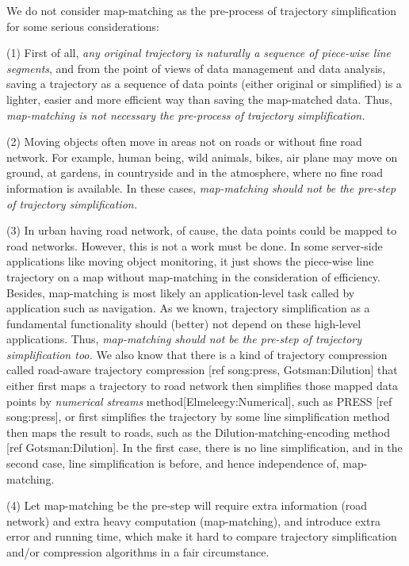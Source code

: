 \documentclass{letter}
\begin{document}
We do not consider map-matching as the pre-process of trajectory simplification for some serious considerations:

(1) First of all, \emph{any original trajectory is naturally a sequence of piece-wise line segments}, and from the point of views of data management and data analysis, saving a trajectory as a sequence of data points (either original or simplified) is a lighter, easier and more efficient way than saving the map-matched data. Thus, \emph{map-matching is not necessary the pre-process of trajectory simplification.} 


(2) Moving objects often move in areas not on roads or without fine road network. For example, human being, wild animals, bikes, air plane may move on ground, at gardens, in countryside and in the atmosphere, where no fine road information is available. In these cases, \emph{map-matching should not be the pre-step of trajectory simplification.}

(3) In urban having road network, of cause, the data points could be mapped to road networks. However, this is not a work must be done. In some server-side applications like moving object monitoring, it just shows the piece-wise line trajectory on a map without map-matching in the consideration of efficiency. Besides, map-matching is most likely an application-level task called by application such as navigation. As we known, trajectory simplification as a fundamental functionality should (better) not depend on these high-level applications. Thus, \emph{map-matching should not be the pre-step of trajectory simplification too.}
%
We also know that there is a kind of trajectory compression called road-aware trajectory compression [ref song:press, Gotsman:Dilution] that either first maps a trajectory to road network then simplifies those mapped data points by \emph{numerical streams} method[Elmeleegy:Numerical], such as PRESS [ref song:press], or first simplifies the trajectory by some line simplification method then maps the result to roads, such as the Dilution-matching-encoding method [ref Gotsman:Dilution]. In the first case, there is no line simplification, and in the second case, line simplification is before, and hence independence of, map-matching. 

(4) Let map-matching be the pre-step will require extra information (road network) and extra heavy computation (map-matching), and introduce extra error and running time, which make it hard to compare trajectory simplification and/or compression algorithms in a fair circumstance.
\end{document}

